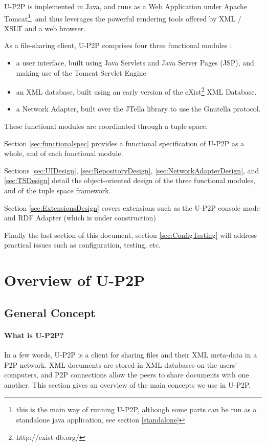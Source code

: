 \documentclass[titlepage]{article}%
\begin{document}
U-P2P is implemented in Java, and runs as a Web Application under Apache Tomcat\footnote{this is the main way of running U-P2P, although some parts can be run as a standalone java application, see section \ref{standalone}}, and thus leverages the powerful rendering tools offered by XML / XSLT and a web browser.

As a file-sharing client, U-P2P comprises four three functional modules : 
\begin{itemize}
\item a user interface, built using Java Servlets and Java Server Pages (JSP), and making use of the Tomcat Servlet Engine
\item an XML database, built using an early version of the eXist\footnote{http://exist-db.org/} XML Database.
\item a Network Adapter, built over the JTella library to use the Gnutella protocol.
\end{itemize}
These functional modules are coordinated through a tuple space. 

Section \ref{sec:functionalspec} provides a functional specification of U-P2P as a whole, and of each functional module.

Sections \ref{sec:UIDesign}, \ref{sec:RepositoryDesign}, \ref{sec:NetworkAdapterDesign}, and \ref{sec:TSDesign} detail the object-oriented design of the three functional modules, and of the tuple space framework.

Section \ref{sec:ExtensionsDesign} covers extensions such as the U-P2P console mode and RDF Adapter (which is under construction)

Finally the last section of this document, section \ref{sec:ConfigTesting} will address practical issues such as configuration, testing, etc.

\section{Overview of U-P2P}
\label{sec:concept}
\subsection{General Concept}
\paragraph{What is U-P2P?}
In a few words, U-P2P is a client for sharing files and their XML meta-data in a P2P network. XML documents are stored in XML databases on the users' computers, and P2P connections allow the peers to share documents with one another. This section gives an overview of the main concepts we use in U-P2P.
\end{document}
